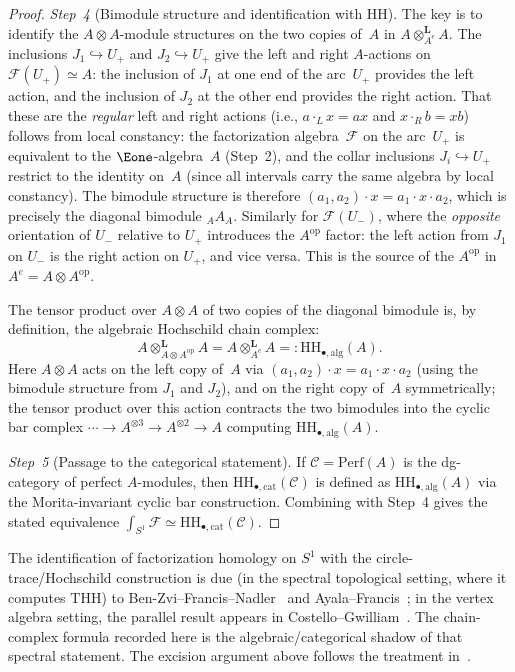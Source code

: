 \begin{proof}
\emph{Step~4} (Bimodule structure and identification with HH).
The key is to identify the $A \otimes A$-module structures on the two
copies of~$A$ in
$A \otimes^{\mathbf{L}}_{A^e} A$. The inclusions
$J_1 \hookrightarrow U_+$ and $J_2 \hookrightarrow U_+$ give the
left and right $A$-actions on $\mathcal{F}(U_+) \simeq A$: the
inclusion of $J_1$ at one end of the arc~$U_+$ provides the left
action, and the inclusion of $J_2$ at the other end provides the
right action. That these are the \emph{regular} left and right
actions (i.e., $a \cdot_L x = ax$ and $x \cdot_R b = xb$) follows
from local constancy: the factorization algebra~$\mathcal{F}$ on the
arc~$U_+$ is equivalent to the $\Eone$-algebra~$A$ (Step~2), and
the collar inclusions $J_i \hookrightarrow U_+$ restrict to the
identity on~$A$ (since all intervals carry the same algebra by local
constancy). The bimodule structure is therefore
$(a_1, a_2) \cdot x = a_1 \cdot x \cdot a_2$, which is precisely the
diagonal bimodule ${}_A A_A$. Similarly for $\mathcal{F}(U_-)$, where
the \emph{opposite} orientation of $U_-$ relative to $U_+$ introduces
the $A^{\mathrm{op}}$ factor: the left action from $J_1$ on $U_-$
is the right action on $U_+$, and vice versa. This is the source
of the $A^{\mathrm{op}}$ in
$A^e = A \otimes A^{\mathrm{op}}$.

The tensor product over $A \otimes A$ of two copies of the diagonal
bimodule is, by definition, the algebraic Hochschild chain complex:
\[
A \otimes^{\mathbf{L}}_{A \otimes A^{\mathrm{op}}} A
= A \otimes^{\mathbf{L}}_{A^e} A
=: \mathrm{HH}_{\bullet,\mathrm{alg}}(A).
\]
Here $A \otimes A$ acts on the left copy of~$A$
via $(a_1, a_2) \cdot x = a_1 \cdot x \cdot a_2$
(using the bimodule structure from $J_1$ and $J_2$), and on the
right copy of~$A$ symmetrically; the tensor product over this action
contracts the two bimodules into the cyclic bar complex
$\cdots \to A^{\otimes 3} \to A^{\otimes 2} \to A$ computing
$\mathrm{HH}_{\bullet,\mathrm{alg}}(A)$.

\emph{Step~5} (Passage to the categorical statement).
If $\mathcal{C} = \mathrm{Perf}(A)$ is the dg-category of perfect
$A$-modules, then
$\mathrm{HH}_{\bullet,\mathrm{cat}}(\mathcal{C})$ is defined as
$\mathrm{HH}_{\bullet,\mathrm{alg}}(A)$ via the Morita-invariant
cyclic bar construction. Combining with Step~4 gives the stated
equivalence
$\int_{S^1} \mathcal{F} \simeq
\mathrm{HH}_{\bullet,\mathrm{cat}}(\mathcal{C})$.
\end{proof}

\begin{remark}[Provenance]
\label{rem:annulus-provenance}
The identification of factorization homology on $S^1$ with the
circle-trace/Hochschild construction is due (in the spectral
topological setting, where it computes $\mathrm{THH}$) to
Ben-Zvi--Francis--Nadler~\cite{BZFN10} and
Ayala--Francis~\cite{AF15}; in the vertex algebra setting, the
parallel result appears in Costello--Gwilliam~\cite[Chapter~5]{CG17}.
The chain-complex formula recorded here is the algebraic/categorical
shadow of that spectral statement. The excision argument above
follows the treatment in~\cite{AF15}.
\end{remark}


